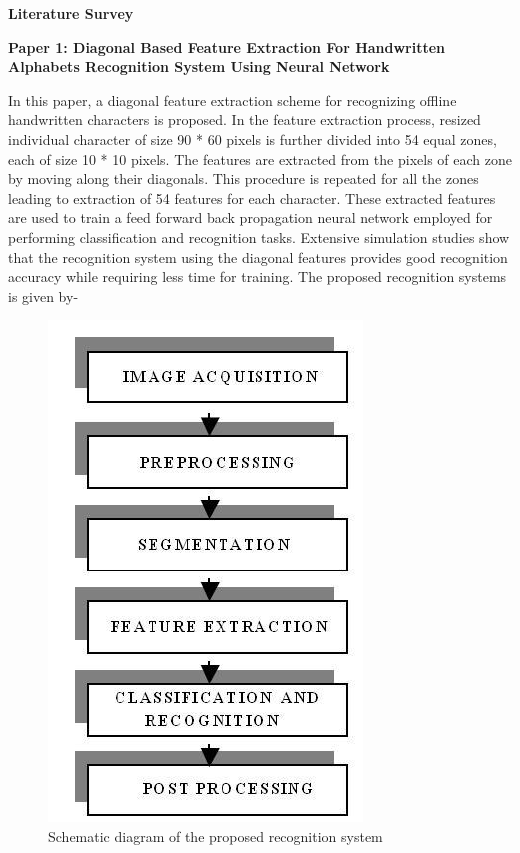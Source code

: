 \documentclass[main.tex]{subfiles}
\begin{document}
\begin{flushleft}
\Large{\bf{Literature Survey}}
\end{flushleft}
\vspace{1.5mm}
\begin{flushleft}
\bf{Paper 1: Diagonal Based Feature Extraction For Handwritten Alphabets 
	Recognition System Using Neural Network}
\end{flushleft}
\vspace{1.5mm}
\justify
In this paper, a diagonal feature extraction scheme for recognizing offline
handwritten characters is proposed. In the feature extraction process, resized
individual character of size 90 * 60 pixels is further divided into 54 equal
zones, each of size 10 * 10 pixels. The features are extracted from the pixels
of each zone by moving along their diagonals. This procedure is repeated for all
the zones leading to extraction of 54 features for each character. These
extracted features are used to train a feed forward back propagation neural
network employed for performing classification and recognition tasks. Extensive
simulation studies show that the recognition system using the diagonal features
provides good recognition accuracy while requiring less time for training. The
proposed recognition systems is given by-
\begin{figure}[H]
	\centering
	\includegraphics{figures/figure-1.png}
	\caption{Schematic diagram of the proposed recognition system}
	\label{fig1}
\end{figure}
\end{document}
